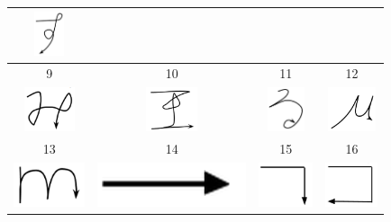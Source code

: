 \begin{table}
\begin{center}
\begin{tabular}{ c | c | c | c  }
    \includegraphics[width=0.2\linewidth, height=13mm]{./figures/gesture_su.png}  \\ \hline
    9 & 10 & 11 & 12  \\ \hline
    \includegraphics[width=0.2\linewidth, height=13mm]{./figures/gesture_mi.png} & 
    \includegraphics[width=0.2\linewidth, height=13mm]{./figures/gesture_wang.png} &
    \includegraphics[width=0.2\linewidth, height=13mm]{./figures/gesture_ru.png} &
    \includegraphics[width=0.2\linewidth, height=13mm]{./figures/gesture_miu.png}	\\ \hline
    13 & 14 & 15 & 16  \\ \hline
    \includegraphics[width=0.2\linewidth, height=13mm]{./figures/gesture_m.png} &
    \includegraphics[width=0.2\linewidth, height=13mm]{./figures/gesture_14.png} &
    \includegraphics[width=0.2\linewidth, height=13mm]{./figures/gesture_15.png} & 
    \includegraphics[width=0.2\linewidth, height=13mm]{./figures/gesture_16.png}  \\ \hline

\end{tabular}
\end{center}
\end{table}

